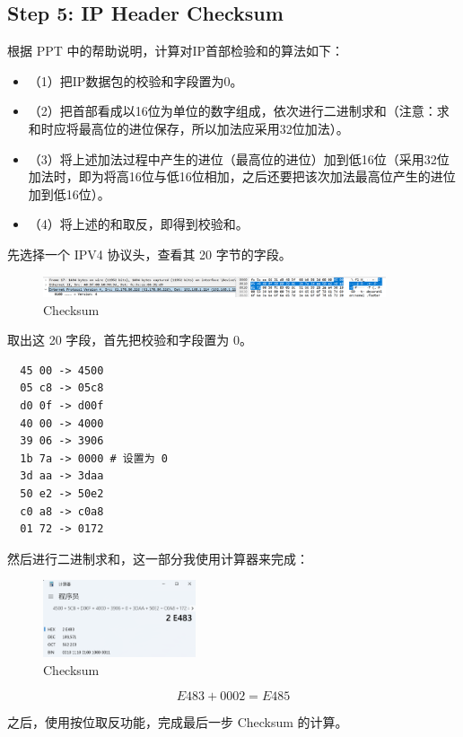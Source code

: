 \documentclass[14pt,a4paper,UTF8,twoside]{article}
\begin{document}
\subsection{Step 5: IP Header Checksum}

根据 PPT 中的帮助说明，计算对IP首部检验和的算法如下：
\begin{itemize}
  \item （1）把IP数据包的校验和字段置为0。
  \item （2）把首部看成以16位为单位的数字组成，依次进行二进制求和（注意：求和时应将最高位的进位保存，所以加法应采用32位加法）。
  \item （3）将上述加法过程中产生的进位（最高位的进位）加到低16位（采用32位加法时，即为将高16位与低16位相加，之后还要把该次加法最高位产生的进位加到低16位）。
  \item （4）将上述的和取反，即得到校验和。
\end{itemize}

先选择一个 IPV4 协议头，查看其 20 字节的字段。

\begin{figure}[H]
  \centering
  \includegraphics[width=0.9\textwidth]{lab3/checksumready.png}
  \caption{Checksum}
\end{figure}

取出这 20 字段，首先把校验和字段置为 0。

\begin{lstlisting}
  45 00 -> 4500
  05 c8 -> 05c8
  d0 0f -> d00f
  40 00 -> 4000
  39 06 -> 3906
  1b 7a -> 0000 # 设置为 0
  3d aa -> 3daa
  50 e2 -> 50e2
  c0 a8 -> c0a8
  01 72 -> 0172  
\end{lstlisting}

然后进行二进制求和，这一部分我使用计算器来完成：

\begin{figure}[H]
  \centering
  \includegraphics[width=0.4\textwidth]{lab3/calculator.png}
  \caption{Checksum}
\end{figure}

\[
E483 + 0002 = E485
\]

之后，使用按位取反功能，完成最后一步 Checksum 的计算。
\end{document}
